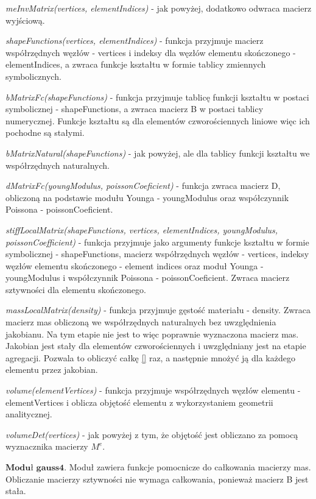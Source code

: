 \textit{meInvMatrix(vertices, elementIndices)} - jak powyżej, dodatkowo odwraca macierz wyjściową.

\textit{shapeFunctions(vertices, elementIndices)} - funkcja przyjmuje macierz współrzędnych węzłów - vertices i indeksy dla węzłów elementu skończonego - elementIndices, a zwraca funkcje kształtu w formie tablicy zmiennych symbolicznych.

\textit{bMatrixFc(shapeFunctions)} - funkcja przyjmuje tablicę funkcji kształtu w postaci symbolicznej - shapeFunctions, a zwraca macierz B w postaci tablicy numerycznej. Funkcje kształtu są dla elementów czworościennych liniowe więc ich pochodne są stałymi. 

\textit{bMatrixNatural(shapeFunctions)} - jak powyżej, ale dla tablicy funkcji kształtu we współrzędnych naturalnych.

\textit{dMatrixFc(youngModulus, poissonCoeficient)} - funkcja zwraca macierz D, obliczoną na podstawie modułu Younga - youngModulus oraz współczynnik Poissona - poissonCoeficient.

\textit{stiffLocalMatrix(shapeFunctions, vertices, elementIndices, youngModulus, poissonCoefficient)} - funkcja przyjmuje jako argumenty funkcje kształtu w formie symbolicznej - shapeFunctions, macierz współrzędnych węzłów - vertices, indeksy węzłów elementu skończonego - element indices oraz moduł Younga - youngModulus i współczynnik Poissona - poissonCoeficient. Zwraca macierz sztywności dla elementu skończonego.

\textit{massLocalMatrix(density)} - funkcja przyjmuje gęstość materiału - density. Zwraca macierz mas obliczoną we współrzędnych naturalnych bez uwzględnienia jakobianu. Na tym etapie nie jest to więc poprawnie wyznaczona macierz mas. Jakobian jest stały dla elementów czworościennych i uwzględniany jest na etapie agregacji. Pozwala to obliczyć całkę \ref{} raz, a następnie mnożyć ją dla każdego elementu przez jakobian.

\textit{volume(elementVertices)} - funkcja przyjmuje współrzędnych węzłów elementu - elementVertices i oblicza objętość elementu z wykorzystaniem geometrii analitycznej.

\textit{volumeDet(vertices)} - jak powyżej z tym, że objętość jest obliczano za pomocą wyznacznika macierzy \( M^e \).

 \( \textbf{Moduł gauss4} \).
Moduł zawiera funkcje pomocnicze do całkowania macierzy mas. Obliczanie macierzy sztywności nie wymaga całkowania, ponieważ macierz B jest stała.

